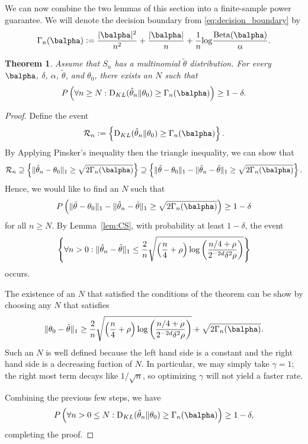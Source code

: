 \documentclass[11pt]{article}
\def\log{{\rm log}}
\newcommand{\Beta}{\mathrm{Beta}}
\newcommand{\KL}{\mathrm{D}_{KL}}
\newtheorem{thm}{Theorem}[section]
\newcommand{\df}{\vcentcolon=}
\newcommand{\pfrac}[2]{\left(\frac{#1}{#2}\right)}
\begin{document}
We can now combine the two lemmas of this section into a finite-sample power guarantee. We will denote the decision boundary from \eqref{eq:decision_boundary} by
\[\Gamma_n(\balpha)
  \df
  \frac{|\balpha|^2}{n^2} + \frac{|\balpha|}{n}
  +
  \frac{1}{n}\log\frac{\Beta(\balpha)}{\alpha}.
\]
\begin{thm}\label{thm:power_lower_bound}
  Assume that $S_n$ has a multinomial $\tilde\theta$ distribution. For every $\balpha$, $\delta$, $\alpha$, $\tilde\theta$, and $\theta_0$, there exists an $N$ such that
  \begin{equation*}
    P\left(\forall n \geq N: \KL(\hat\theta_n \Vert \theta_0) \geq \Gamma_n(\balpha)\right)
    \geq 1-\delta.
  \end{equation*}
\end{thm}
\begin{proof}
  Define the event
  \[
    \mathcal R_n
    \df
    \left\{
    \KL(\hat\theta_n \Vert \theta_0) \geq \Gamma_n(\balpha)
  \right\}.
\]
By Applying Pinsker's inequality then the triangle inequality, we can show that
\[
  \mathcal R_n \supseteq
  \left\{
    \Vert \hat\theta_n - \theta_0\Vert_1 \geq \sqrt{2\Gamma_n(\balpha)}
  \right\}
  \supseteq
    \left\{
      \Vert \tilde\theta - \theta_0\Vert_1
      -
      \Vert \hat\theta_n - \tilde\theta\Vert_1
      \geq \sqrt{2\Gamma_n(\balpha)}
  \right\}.
\]
Hence, we would like to find an $N$ such that
\[
      P\left(
      \Vert \tilde\theta - \theta_0\Vert_1
      -
      \Vert \hat\theta_n - \tilde\theta\Vert_1
      \geq \sqrt{2\Gamma_n(\balpha)}
  \right)\geq 1-\delta
\]
for all $n\geq N$. By Lemma~\ref{lem:CS}, with probability at least $1-\delta$, the event
\begin{align*}
  \left\{ \forall n > 0:
  \Vert\hat\theta_n- \tilde\theta\Vert_1
  \leq
    \frac{2}{n}\sqrt{\left(\frac{n}{4} + \rho\right)\log\pfrac{n/4+\rho}{2^{-2d}\delta^2 \rho}}\right\}
\end{align*}
occurs.

The existence of an $N$ that satisfied the conditions of the theorem can be show by choosing any $N$ that satisfies
\[
  \Vert \theta_0- \tilde\theta\Vert_{1}
    \geq
        \frac{2}{n}\sqrt{\left(\frac{n}{4} + \rho\right)\log\pfrac{n/4+\rho}{2^{-2d}\delta^2 \rho}}
    + \sqrt{2\Gamma_n(\balpha)}.
  \]
Such an $N$ is well defined because the left hand side is a constant and the right hand side is a decreasing fuction of $N$. In particular, we may simply take $\gamma = 1$; the right most term decays like $1/\sqrt{n}$, so optimizing $\gamma$ will not yield a faster rate. 


Combining the previous few steps, we have
\begin{equation*}
    P\left(\forall n>0 \leq N: \KL(\hat\theta_n \Vert \theta_0) \geq \Gamma_n(\balpha)\right)
    \geq 1-\delta,
  \end{equation*}
  completing the proof.
\end{proof}
\end{document}
